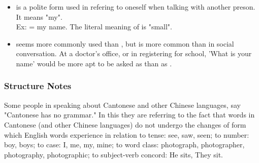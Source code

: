 \begin{enumerate}
\begin{itemize}
\begin{itemize}
            \item {} is a polite form used in refering to oneself when talking with another preson. It means "my".\\
            Ex:  = my name. The literal meaning of  is "small".

            \item {} seems more commonly used than , but  is more common than  in social conversation. At a doctor's office, or in registering for school, 'What is your name' would be more apt to be asked as  than as .
        \end{itemize}
    \end{itemize}
\end{enumerate}

\subsubsection{Structure Notes}
Some people in speaking about Cantonese and other Chinese languages, say "Cantonese has no grammar." In this they are referring to the fact that words in Cantonese (and other Chinese languages) do not undergo the changes of form which English words experience in relation to tense: see, saw, seen; to number: boy, boys; to case: I, me, my, mine; to word class: photograph, photographer, photography, photographic; to subject-verb concord: He sits, They sit.

